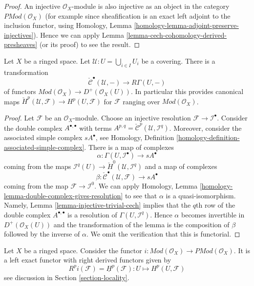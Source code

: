 \begin{proof}
An injective $\mathcal{O}_X$-module is also injective as an object in
the category $\textit{PMod}(\mathcal{O}_X)$ (for example since
sheafification is an exact left adjoint to the inclusion functor,
using Homology, Lemma \ref{homology-lemma-adjoint-preserve-injectives}).
Hence we can apply Lemma \ref{lemma-cech-cohomology-derived-presheaves}
(or its proof) to see the result.
\end{proof}

\begin{lemma}
\label{lemma-cech-cohomology}
Let $X$ be a ringed space.
Let $\mathcal{U} : U = \bigcup_{i \in I} U_i$ be a covering.
There is a transformation
$$
\check{\mathcal{C}}^\bullet(\mathcal{U}, -)
\longrightarrow
R\Gamma(U, -)
$$
of functors
$\textit{Mod}(\mathcal{O}_X) \to D^{+}(\mathcal{O}_X(U))$.
In particular this provides canonical maps
$\check{H}^p(\mathcal{U}, \mathcal{F}) \to H^p(U, \mathcal{F})$ for
$\mathcal{F}$ ranging over $\textit{Mod}(\mathcal{O}_X)$.
\end{lemma}

\begin{proof}
Let $\mathcal{F}$ be an $\mathcal{O}_X$-module. Choose an injective resolution
$\mathcal{F} \to \mathcal{I}^\bullet$. Consider the double complex
$A^{\bullet, \bullet}$ with terms
$A^{p, q} = \check{\mathcal{C}}^p(\mathcal{U}, \mathcal{I}^q)$.
Moreover, consider the associated simple complex
$sA^\bullet$, see
Homology, Definition \ref{homology-definition-associated-simple-complex}.
There is a map of complexes
$$
\alpha :
\Gamma(U, \mathcal{I}^\bullet)
\longrightarrow
sA^\bullet
$$
coming from the maps
$\mathcal{I}^q(U) \to \check{H}^0(\mathcal{U}, \mathcal{I}^q)$
and a map of complexes
$$
\beta :
\check{\mathcal{C}}^\bullet(\mathcal{U}, \mathcal{F})
\longrightarrow
sA^\bullet
$$
coming from the map $\mathcal{F} \to \mathcal{I}^0$.
We can apply
Homology, Lemma \ref{homology-lemma-double-complex-gives-resolution}
to see that $\alpha$ is a quasi-isomorphism.
Namely, Lemma \ref{lemma-injective-trivial-cech} implies that
the $q$th row of the double complex $A^{\bullet, \bullet}$ is a
resolution of $\Gamma(U, \mathcal{I}^q)$.
Hence $\alpha$ becomes invertible in $D^{+}(\mathcal{O}_X(U))$ and
the transformation of the lemma is the composition of $\beta$
followed by the inverse of $\alpha$. We omit the verification
that this is functorial.
\end{proof}

\begin{lemma}
\label{lemma-include}
Let $X$ be a ringed space.
Consider the functor
$i : \textit{Mod}(\mathcal{O}_X) \to \textit{PMod}(\mathcal{O}_X)$.
It is a left exact functor with right derived functors given by
$$
R^pi(\mathcal{F}) = \underline{H}^p(\mathcal{F}) :
U \longmapsto H^p(U, \mathcal{F})
$$
see discussion in Section \ref{section-locality}.
\end{lemma}

